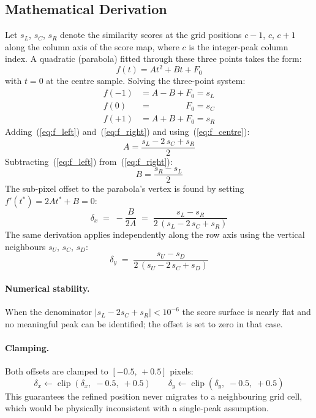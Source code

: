 \documentclass[12pt,a4paper]{article}
\begin{document}
\subsection{Mathematical Derivation}

Let $s_L$, $s_C$, $s_R$ denote the similarity scores at the grid positions
$c-1$, $c$, $c+1$ along the column axis of the score map,
where $c$ is the integer-peak column index.
A quadratic (parabola) fitted through these three points takes the form:
\begin{equation}
  f(t) = At^2 + Bt + F_0
\end{equation}
with $t=0$ at the centre sample.  Solving the three-point system:
\begin{align}
  f(-1) &= A - B + F_0 = s_L \label{eq:f_left} \\
  f( 0) &= \phantom{A-B+{}}F_0 = s_C \label{eq:f_centre} \\
  f(+1) &= A + B + F_0 = s_R \label{eq:f_right}
\end{align}
Adding~(\ref{eq:f_left}) and~(\ref{eq:f_right}) and using~(\ref{eq:f_centre}):
\begin{equation}
  A = \frac{s_L - 2\,s_C + s_R}{2}
\end{equation}
Subtracting~(\ref{eq:f_left}) from~(\ref{eq:f_right}):
\begin{equation}
  B = \frac{s_R - s_L}{2}
\end{equation}
The sub-pixel offset to the parabola's vertex is found by setting
$f'(t^*) = 2At^* + B = 0$:
\begin{equation}
  \boxed{
    \delta_x \;=\; -\frac{B}{2A}
           \;=\; \frac{s_L - s_R}{2\,(s_L - 2\,s_C + s_R)}
  }
  \label{eq:subpixel_x}
\end{equation}
The same derivation applies independently along the row axis using the
vertical neighbours $s_U$, $s_C$, $s_D$:
\begin{equation}
  \boxed{
    \delta_y \;=\; \frac{s_U - s_D}{2\,(s_U - 2\,s_C + s_D)}
  }
  \label{eq:subpixel_y}
\end{equation}

\paragraph{Numerical stability.}
When the denominator $|s_L - 2s_C + s_R| < 10^{-6}$ the score surface is
nearly flat and no meaningful peak can be identified; the offset is set to
zero in that case.

\paragraph{Clamping.}
Both offsets are clamped to $[-0.5,\,+0.5]$ pixels:
\begin{equation}
  \delta_x \leftarrow \operatorname{clip}(\delta_x,\;-0.5,\;+0.5)
  \qquad
  \delta_y \leftarrow \operatorname{clip}(\delta_y,\;-0.5,\;+0.5)
\end{equation}
This guarantees the refined position never migrates to a neighbouring
grid cell, which would be physically inconsistent with a single-peak
assumption.
\end{document}
